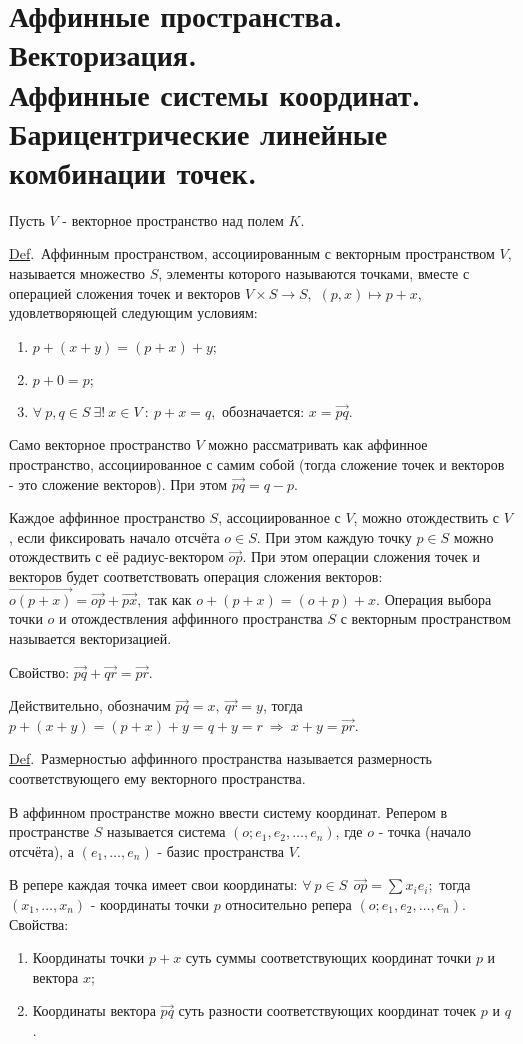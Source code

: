 \documentclass[draft]{article}%
\newcommand{\de}{\par\noindent\underline{Def}.\ }%
\newcommand{\ab}{\par\noindent}%
\newcommand{\baz}[1]{\left(#1_1,\dots,#1_n\right)}%
\newcommand{\nn}[1]{#1_1,#1_2,\dots,#1_n}%
\newcommand{\oi}[1]{\overrightarrow{#1}}%
\begin{document}
\section{Аффинные пространства. Векторизация.\\ Аффинные системы координат.\\ Барицентрические линейные комбинации точек.}
\label{q36} %
Пусть $V$ - векторное пространство над полем $K$. %
\de Аффинным пространством, ассоциированным с векторным пространством $V$, называется множество $S$, элементы
которого называются точками, вместе с операцией сложения точек и векторов $V\times S\rightarrow S,$
$(p,x)\mapsto p+x$, удовлетворяющей следующим условиям:
\begin{enumerate}
    \item $p+(x+y)=(p+x)+y;$
    \item $p+0=p;$
    \item $\forall\ p,q\in S \ \exists !\ x\in V\ :\ p+x=q,$ обозначается: $x=\oi{pq}.$
\end{enumerate}
\ab Само векторное пространство $V$ можно рассматривать как аффинное пространство, ассоциированное с
самим собой
(тогда сложение точек и векторов - это сложение векторов). При этом $\oi{pq}=q-p.$ %
\ab Каждое аффинное пространство $S$, ассоциированное с $V$, можно отождествить с $V$, если фиксировать начало
отсчёта $o\in S.$ При этом каждую точку $p\in S$ можно отождествить с её радиус-вектором $\oi{op}.$ При этом
операции сложения точек и векторов будет соответствовать операция сложения векторов:
$\oi{o(p+x)}=\oi{op}+\oi{px},$ так как $o+(p+x)=(o+p)+x.$ Операция выбора
точки $o$ и отождествления аффинного пространства $S$ с векторным пространством называется векторизацией. %
\ab Свойство: $\oi{pq}+\oi{qr}=\oi{pr}.$  %
\ab Действительно, обозначим $\oi{pq}=x,\ \oi{qr}=y$, тогда $p+(x+y)=(p+x)+y=q+y=r\ \Rightarrow\ x+y=\oi{pr}$. %
\de Размерностью аффинного пространства называется размерность соответствующего ему векторного пространства.
\ab В аффинном пространстве можно ввести систему координат. Репером в пространстве $S$ называется система
$(o;\nn{e})$, где $o$ - точка (начало отсчёта), а $\baz{e}$ - базис пространства $V$. %
\ab В репере каждая точка имеет свои координаты: $\forall\ p\in S\ \ \oi{op}=\sum x_ie_i;$ тогда $\baz{x}$ -
координаты точки $p$ относительно репера $(o;\nn{e})$. Свойства:
\begin{enumerate}
    \item Координаты точки $p+x$ суть суммы соответствующих координат точки $p$ и вектора $x$;
    \item Координаты вектора $\oi{pq}$ суть разности соответствующих координат точек $p$ и $q$.
\end{enumerate}
\end{document}
